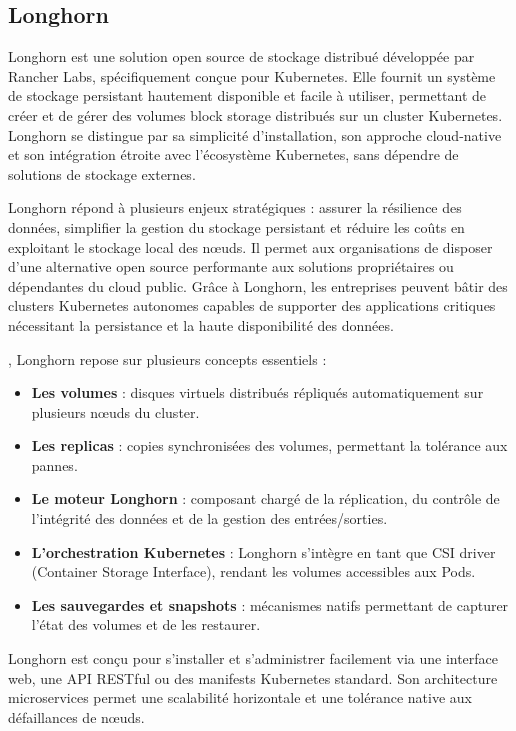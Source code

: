 \subsection{Longhorn}

Longhorn est une solution open source de stockage distribué développée par Rancher Labs, spécifiquement conçue pour Kubernetes. Elle fournit un système de stockage persistant hautement disponible et facile à utiliser, permettant de créer et de gérer des volumes block storage distribués sur un cluster Kubernetes. Longhorn se distingue par sa simplicité d’installation, son approche cloud-native et son intégration étroite avec l’écosystème Kubernetes, sans dépendre de solutions de stockage externes.

 Longhorn répond à plusieurs enjeux stratégiques  : assurer la résilience des données, simplifier la gestion du stockage persistant et réduire les coûts en exploitant le stockage local des nœuds. Il permet aux organisations de disposer d’une alternative open source performante aux solutions propriétaires ou dépendantes du cloud public. Grâce à Longhorn, les entreprises peuvent bâtir des clusters Kubernetes autonomes capables de supporter des applications critiques nécessitant la persistance et la haute disponibilité des données.

, Longhorn repose sur plusieurs concepts essentiels  :
\begin{itemize}
	\item \textbf{Les volumes}  : disques virtuels distribués répliqués automatiquement sur plusieurs nœuds du cluster.
	\item \textbf{Les replicas}  : copies synchronisées des volumes, permettant la tolérance aux pannes.
	\item \textbf{Le moteur Longhorn}  : composant chargé de la réplication, du contrôle de l’intégrité des données et de la gestion des entrées/sorties.
	\item \textbf{L’orchestration Kubernetes}  : Longhorn s’intègre en tant que CSI driver (Container Storage Interface), rendant les volumes accessibles aux Pods.
	\item \textbf{Les sauvegardes et snapshots}  : mécanismes natifs permettant de capturer l’état des volumes et de les restaurer.
\end{itemize}

Longhorn est conçu pour s’installer et s’administrer facilement via une interface web, une API RESTful ou des manifests Kubernetes standard. Son architecture microservices permet une scalabilité horizontale et une tolérance native aux défaillances de nœuds.

